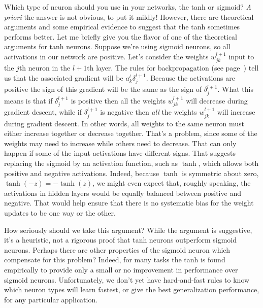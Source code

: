 Which type of neuron should you use in your networks, the tanh or sigmoid? \textit{A priori} the answer is not obvious, to put it mildly! However, there are theoretical arguments and some empirical evidence to suggest that the tanh sometimes performs better. Let me briefly give you the flavor of one of the theoretical arguments for tanh neurons. Suppose we're using sigmoid neurons, so all activations in our network are positive. Let's consider the weights $w^{l+1}_{jk}$ input to the $j$th neuron in the $l+1$th layer. The rules for backpropagation (see page~\pageref{eq:c02-BP4}) tell us that the associated gradient will be $a^l_k \delta^{l+1}_j$. 
Because the activations are positive the sign of this gradient will be the same as the sign of $\delta^{l+1}_j$. What this means is that if $\delta^{l+1}_j$ is positive then all the weights $w^{l+1}_{jk}$ will decrease during gradient descent, while if $\delta^{l+1}_j$ is negative then \textit{all} the weights $w^{l+1}_{jk}$ will increase during gradient descent. In other words, all weights to the same neuron must either increase together or decrease together. That's a problem, since some of the weights may need to increase while others need to decrease. That can only happen if some of the input activations have different signs. That suggests replacing the sigmoid by an activation function, such as $\tanh$, which allows both positive and negative activations. Indeed, because $\tanh$ is symmetric about zero, $\tanh(-z) = -\tanh(z)$, we might even expect that, roughly speaking, the activations in hidden layers would be equally balanced between positive and negative. That would help ensure that there is no systematic bias for the weight updates to be one way or the other.

    How seriously should we take this argument? While the argument is suggestive, it's a heuristic, not a rigorous proof that tanh neurons outperform sigmoid neurons. Perhaps there are other properties of the sigmoid neuron which compensate for this problem? Indeed, for many tasks the tanh is found empirically to provide only a small or no improvement in performance over sigmoid neurons. Unfortunately, we don't yet have hard-and-fast rules to know which neuron types will learn fastest, or give the best generalization performance, for any particular application.
    
